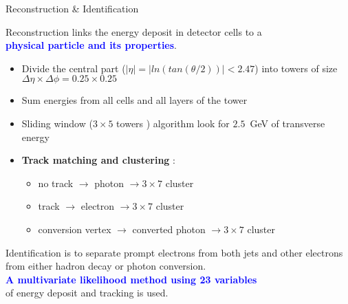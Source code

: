 \begin{frame}{Reconstruction \& Identification}
  \begin{center}
    Reconstruction links the energy deposit in detector cells to a \\ \textcolor{blue}{\bf physical particle and its properties}.
    \vfill
    \begin{itemize}
    \item Divide the central part ($|\eta|=|ln(tan(\theta /2) )|<2.47$) into towers of size $\Delta\eta\times\Delta\phi =0.25\times 0.25$
    \item Sum energies from all cells and all layers of the tower
    \item Sliding window ($3 \times 5$ towers ) algorithm look for $2.5$~GeV of transverse energy
    \item {\bf Track matching and clustering} :\\
      \begin{itemize}
      \item no track $\rightarrow$ photon $\rightarrow 3\times 7$ cluster 
      \item track $\rightarrow$ electron $\rightarrow 3\times 7$ cluster 
      \item conversion vertex $\rightarrow$ converted photon $\rightarrow 3\times 7$ cluster
      \end{itemize}
    \end{itemize}
    \vfill
    Identification is to separate prompt electrons from both jets and other electrons from either hadron decay or photon conversion.\\
    \textcolor{blue}{\bf A multivariate likelihood method using  23 variables} \\of energy deposit and tracking is used.
  \end{center}
\end{frame}
